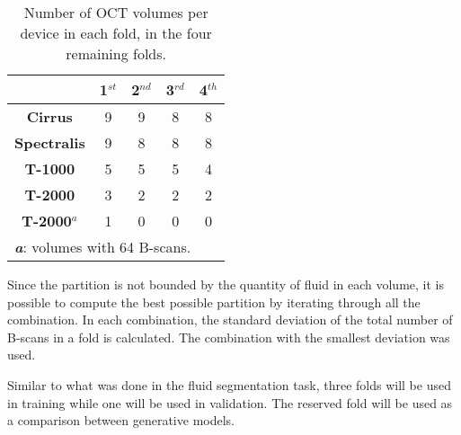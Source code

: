 \begin{table*}[!ht]
	\setlength{\tabcolsep}{6pt}
	\renewcommand{\arraystretch}{1.3}
	\caption{Number of OCT volumes per device in each fold, in the four remaining folds.}
	\centering
	\begin{tabular}{|c|c|c|c|c|}
		\hline
		& \textbf{1$^{st}$} & \textbf{2$^{nd}$} & \textbf{3$^{rd}$} & \textbf{4$^{th}$} \\
		\hline
		\textbf{Cirrus} & 9 & 9 & 8 & 8 \\
		\textbf{Spectralis} & 9 & 8 & 8 & 8 \\
		\textbf{T-1000} & 5 & 5 & 5 & 4 \\
		\textbf{T-2000} & 3 & 2 & 2 & 2 \\
		\textbf{T-2000$^{a}$} & 1 & 0 & 0 & 0 \\
		\hline
		\multicolumn{5}{l}{\textbf{\textit{a}}: volumes with 64 B-scans.} \\
	\end{tabular}
	\label{tab:FourFoldSplit}
\end{table*}

Since the partition is not bounded by the quantity of fluid in each volume, it is possible to compute the best possible partition by iterating through all the combination. In each combination, the standard deviation of the total number of B-scans in a fold is calculated. The combination with the smallest deviation was used. 
\par
Similar to what was done in the fluid segmentation task, three folds will be used in training while one will be used in validation. The reserved fold will be used as a comparison between generative models.

